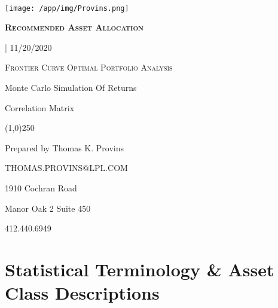 \documentclass{article}
\begin{document}
\begin{titlepage}   %

\begin{center}
	{\scshape\Large\bfseries \, \par}
	\vspace{5cm}


	\texttt{[image: /app/img/Provins.png]}\par



	\vspace{0,5cm}
	{\scshape\Large\bfseries Recommended Asset Allocation

	{} | 11/20/2020 \par}
	\vspace{0,5cm}
	{\scshape\normalsize Frontier Curve Optimal Portfolio Analysis

	Monte Carlo Simulation Of Returns

	Correlation Matrix \par}
\end{center}

	\begin{center}
\line(1,0){250}
\end{center}

	\begin{center}
	 	{
		\small{
		Prepared by Thomas K. Provins

		THOMAS.PROVINS@LPL.COM}
		\par}


	\vfill
\end{center}

	\vfill

	{\begin{center}

	     1910 Cochran Road

	     Manor Oak 2 Suite 450

	     412.440.6949

	\end{center}}

\end{titlepage}


\tableofcontents    %

\begin{center}
\vfill
\vfill

\end{center}
\justify

\newpage    %

\section{Statistical Terminology \& Asset Class Descriptions}
\end{document}
